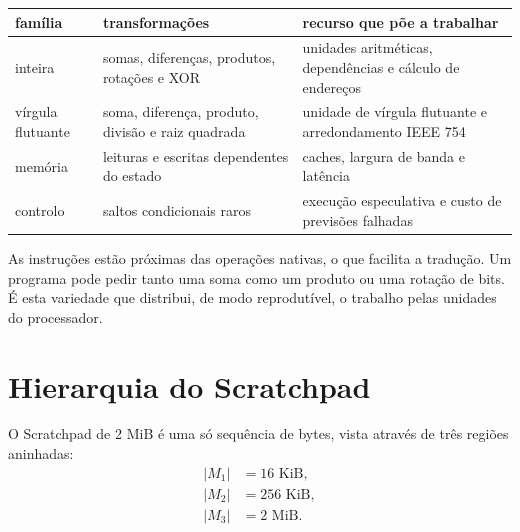 \begin{center}
\begin{tabular}{>{\raggedright\arraybackslash}p{2.3cm}
                >{\raggedright\arraybackslash}p{4.3cm}
                >{\raggedright\arraybackslash}p{5.5cm}}
\textbf{família}&\textbf{transformações}&\textbf{recurso que põe a trabalhar}\\
\hline
inteira&somas, diferenças, produtos, rotações e XOR&unidades aritméticas,
dependências e cálculo de endereços\\
vírgula flutuante&soma, diferença, produto, divisão e raiz quadrada&unidade de
vírgula flutuante e arredondamento IEEE 754\\
memória&leituras e escritas dependentes do estado&caches, largura de banda e
latência\\
controlo&saltos condicionais raros&execução especulativa e custo de previsões
falhadas\\
\end{tabular}
\end{center}

As instruções estão próximas das operações nativas, o que facilita a
tradução. Um programa pode pedir tanto uma soma como um produto ou uma
rotação de bits. É esta variedade que distribui, de modo reprodutível,
o trabalho pelas unidades do processador.


\section{Hierarquia do Scratchpad}
\label{sec:randomx-scratchpad}

O Scratchpad de 2 MiB é uma só sequência de bytes, vista através de três
regiões aninhadas:
\begin{align*}
 |M_1|&=16\text{ KiB},\\
 |M_2|&=256\text{ KiB},\\
 |M_3|&=2\text{ MiB}.
\end{align*}

\begin{center}
\end{center}

